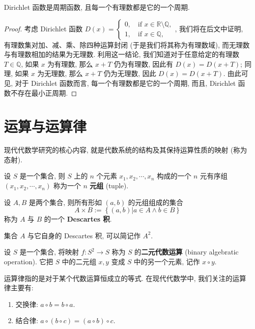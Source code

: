 \documentclass[10pt,UTF8]{book} %
\begin{document}
\begin{example}
    Dirichlet 函数是周期函数, 且每一个有理数都是它的一个周期.
    \begin{proof}
        考虑 Dirichlet 函数 $D(x) = \begin{cases}
            0, \quad \mathrm{if} \,\, x \in \mathbb{R} \setminus \mathbb{Q}, \\ 
            1, \quad \mathrm{if} \,\, x \in \mathbb{Q},
        \end{cases}$, 我们将在后文中证明, {\kaishu 有理数集对加、减、乘、除四种运算封闭} 
        (于是我们将其称为有理数域), 而{\kaishu 无理数与有理数相加的结果为无理数}.
        利用这一结论, 我们知道对于任意给定的有理数 $T \in \mathbb{Q}$,
        如果 $x$ 为有理数, 那么 $x+T$ 仍为有理数, 因此有 $D(x) = D(x+T)$;
        同理, 如果 $x$ 为无理数, 那么 $x+T$ 仍为无理数, 因此 $D(x) = D(x+T)$.
        由此可见, 对于 Dirichlet 函数而言, 每一个有理数都是它的一个周期, 而且,
        Dirichlet 函数不存在最小正周期.
    \end{proof}
\end{example}

\section{运算与运算律}

现代代数学研究的核心内容, 就是代数系统的结构及其保持运算性质的映射 (称为态射).

设 $S$ 是一个集合, 则 $S$ 上的 $n$ 个元素 $x_1, x_2, \cdots, x_n$ 构成的一个 $n$
元有序组 $(x_1, x_2, \cdots, x_n)$ 称为一个 $n$ \textbf{元组} (tuple).

\begin{definition}
    设 $A,B$ 是两个集合, 则所有形如 $(a,b)$ 的元组组成的集合
    \[ A \times B := \left\{
        (a,b) | a \in A \wedge b \in B
    \right\} \]
    称为 $A$ 与 $B$ 的一个 \textbf{Descartes 积}.
\end{definition}

集合 $A$ 与它自身的 Descartes 积, 可以简记作 $A^2$.

\begin{definition}[二元代数运算]
    设 $S$ 是一个集合, 将映射 $f:S^2 \to S$ 称为 $S$ 的\textbf{二元代数运算}
    (binary algebratic operation). 它把 $S$ 中的二元组 $x,y$ 变成 $S$ 中的另一个元素,
    记作 $x \circ y$.
\end{definition}

运算律指的是对于某个代数运算恒成立的等式. 在现代代数学中, 我们关注的运算律主要有:
\begin{enumerate}[label={${\arabic*}^\circ$}, itemsep=0pt]
    \item 交换律: $a \circ b = b \circ a$.
    \item 结合律: $a \circ (b \circ c) = (a \circ b) \circ c$.
\end{enumerate}
\end{document}
